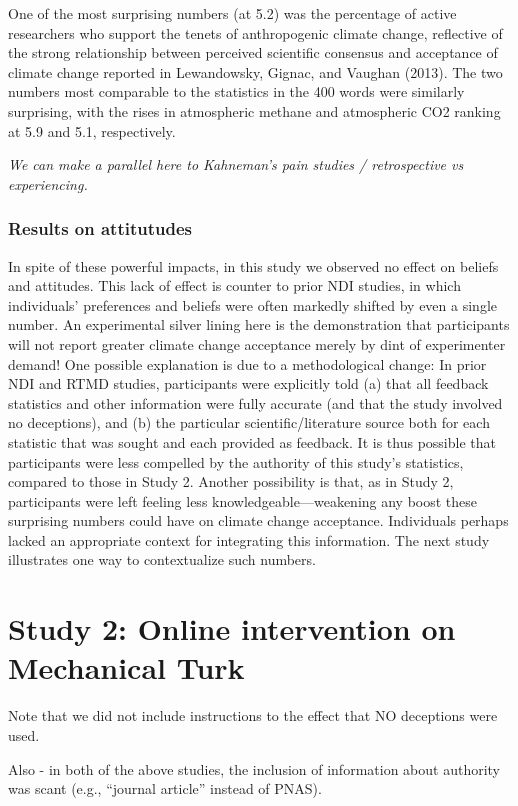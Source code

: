 One of the most surprising numbers (at 5.2) was the percentage of active
researchers who support the tenets of anthropogenic climate change, reflective
of the strong relationship between perceived scientific consensus and acceptance
of climate change reported in Lewandowsky, Gignac, and Vaughan (2013). The two
numbers most comparable to the statistics in the 400 words were similarly
surprising, with the rises in atmospheric methane and atmospheric CO2 ranking at
5.9 and 5.1, respectively.

\emph{We can make a parallel here to Kahneman's pain studies / retrospective vs
experiencing.}

\subsubsection{Results on attitutudes}

In spite of these powerful impacts, in this study we observed no effect on
beliefs and attitudes. This lack of effect is counter to prior NDI studies, in
which individuals’ preferences and beliefs were often markedly shifted by even a
single number. An experimental silver lining here is the demonstration that
participants will not report greater climate change acceptance merely by dint of
experimenter demand! One possible explanation is due to a methodological change:
In prior NDI and RTMD studies, participants were explicitly told (a) that all
feedback statistics and other information were fully accurate (and that the
study involved no deceptions), and (b) the particular scientific/literature
source both for each statistic that was sought and each provided as feedback.
It is thus possible that participants were less compelled by the authority of
this study’s statistics, compared to those in Study 2.  Another possibility is
that, as in Study 2, participants were left feeling less knowledgeable—weakening
any boost these surprising numbers could have on climate change acceptance.
Individuals perhaps lacked an appropriate context for integrating this
information. The next study illustrates one way to contextualize such numbers.

\section{Study 2: Online intervention on Mechanical Turk}

Note that we did not include instructions to the effect that NO deceptions were
used.

Also - in both of the above studies, the inclusion of information about
authority was scant (e.g., “journal article” instead of PNAS).
